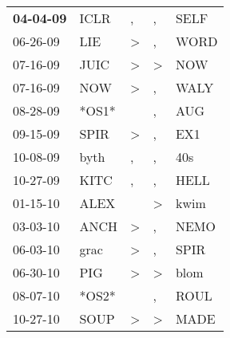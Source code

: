 \begin{supertabular}{p{0.07\textwidth}p{0.06\textwidth}p{0.02\textwidth}p{0.02\textwidth}p{0.06\textwidth}}
 \textbf{04-04-09\textsuperscript{}} &           ICLR\textsuperscript{} &                , &                , &           SELF\textsuperscript{} \\
          06-26-09\textsuperscript{} &            LIE\textsuperscript{} &     \textgreater &                , &           WORD\textsuperscript{} \\
          07-16-09\textsuperscript{} &           JUIC\textsuperscript{} &     \textgreater &     \textgreater &            NOW\textsuperscript{} \\
          07-16-09\textsuperscript{} &            NOW\textsuperscript{} &     \textgreater &                , &           WALY\textsuperscript{} \\
          08-28-09\textsuperscript{} &                            *OS1* &                  &                , &            AUG\textsuperscript{} \\
          09-15-09\textsuperscript{} &           SPIR\textsuperscript{} &     \textgreater &                , &            EX1\textsuperscript{} \\
          10-08-09\textsuperscript{} &           byth\textsuperscript{} &                , &                , &            40s\textsuperscript{} \\
          10-27-09\textsuperscript{} &           KITC\textsuperscript{} &                , &                , &           HELL\textsuperscript{} \\
          01-15-10\textsuperscript{} &           ALEX\textsuperscript{} &                  &     \textgreater &           kwim\textsuperscript{} \\
          03-03-10\textsuperscript{} &           ANCH\textsuperscript{} &     \textgreater &                , &           NEMO\textsuperscript{} \\
          06-03-10\textsuperscript{} &           grac\textsuperscript{} &     \textgreater &                , &           SPIR\textsuperscript{} \\
          06-30-10\textsuperscript{} &            PIG\textsuperscript{} &     \textgreater &     \textgreater &           blom\textsuperscript{} \\
          08-07-10\textsuperscript{} &                            *OS2* &                  &                , &           ROUL\textsuperscript{} \\
          10-27-10\textsuperscript{} &           SOUP\textsuperscript{} &     \textgreater &     \textgreater &           MADE\textsuperscript{} \\

\end{supertabular}
